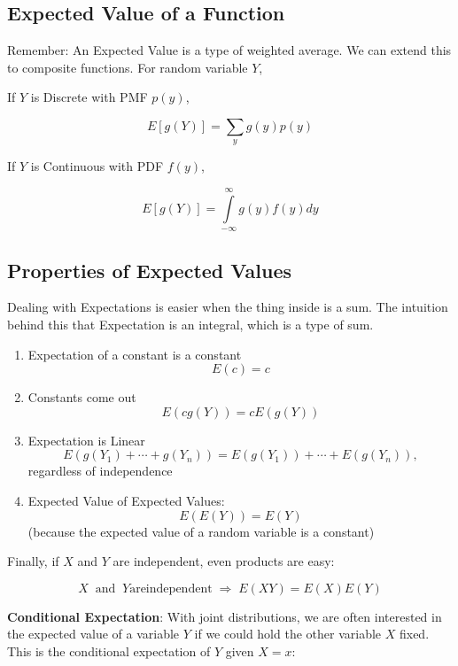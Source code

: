 \documentclass[
  letterpaper,
]{book}
\providecommand{\tightlist}{%
  \setlength{\itemsep}{0pt}\setlength{\parskip}{0pt}}\usepackage{longtable,booktabs,array}
\theoremstyle{definition}
\theoremstyle{definition}
\theoremstyle{plain}
\theoremstyle{definition}
\theoremstyle{plain}
\theoremstyle{plain}
\theoremstyle{remark}
\begin{document}
\hypertarget{expected-value-of-a-function}{%
\subsection*{Expected Value of a
Function}\label{expected-value-of-a-function}}

Remember: An Expected Value is a type of weighted average. We can extend
this to composite functions. For random variable \(Y\),

If \(Y\) is Discrete with PMF \(p(y)\),

\[E[g(Y)]=\sum\limits_y g(y)p(y)\]

If \(Y\) is Continuous with PDF \(f(y)\),

\[E[g(Y)]=\int\limits_{-\infty}^\infty g(y)f(y)dy\]

\hypertarget{properties-of-expected-values}{%
\subsection*{Properties of Expected
Values}\label{properties-of-expected-values}}

Dealing with Expectations is easier when the thing inside is a sum. The
intuition behind this that Expectation is an integral, which is a type
of sum.

\hypertarget{prop-}{}
\begin{enumerate}
\def\labelenumi{\arabic{enumi}.}
\tightlist
\item
  Expectation of a constant is a constant \[E(c)=c\]
\item
  Constants come out \[E(c g(Y))= c E(g(Y))\]
\item
  Expectation is Linear
  \[E(g(Y_1) + \cdots + g(Y_n))=E(g(Y_1)) +\cdots+E(g(Y_n)),\]
  regardless of independence
\item
  Expected Value of Expected Values: \[E(E(Y)) = E(Y)\] (because the
  expected value of a random variable is a constant)
\end{enumerate}

Finally, if \(X\) and \(Y\) are independent, even products are easy:

\[X \;\; \mathrm{ and } \;\; Y \mathrm{are independent } \;\Rightarrow\; E(XY) = E(X)E(Y)\]

\textbf{Conditional Expectation}: With joint distributions, we are often
interested in the expected value of a variable \(Y\) if we could hold
the other variable \(X\) fixed. This is the conditional expectation of
\(Y\) given \(X = x\):
\end{document}
